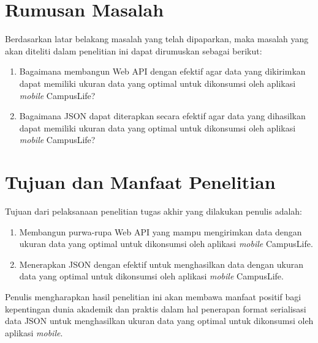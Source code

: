 \documentclass[a4paper, 12pt]{report}
\begin{document}
\section{Rumusan Masalah}
\onehalfspacing Berdasarkan latar belakang masalah yang telah dipaparkan, maka masalah yang akan diteliti dalam penelitian ini dapat dirumuskan sebagai berikut:
\begin{enumerate}
  \item Bagaimana membangun Web API dengan efektif agar data yang dikirimkan dapat memiliki ukuran data yang optimal untuk dikonsumsi oleh aplikasi \textit{mobile} CampusLife?
  \item Bagaimana JSON dapat diterapkan secara efektif agar data yang dihasilkan dapat memiliki ukuran data yang optimal untuk dikonsumsi oleh aplikasi \textit{mobile} CampusLife?
\end{enumerate}

\section{Tujuan dan Manfaat Penelitian}
\onehalfspacing Tujuan dari pelaksanaan penelitian tugas akhir yang dilakukan penulis adalah:
\begin{enumerate}
  \item Membangun purwa-rupa Web API yang mampu mengirimkan data dengan ukuran data yang optimal untuk dikonsumsi oleh aplikasi \textit{mobile} CampusLife.
  \item Menerapkan JSON dengan efektif untuk menghasilkan data dengan ukuran data yang optimal untuk dikonsumsi oleh aplikasi \textit{mobile} CampusLife.
\end{enumerate}

\onehalfspacing Penulis mengharapkan hasil penelitian ini akan membawa manfaat positif bagi kepentingan dunia akademik dan praktis dalam hal penerapan format serialisasi data JSON untuk menghasilkan ukuran data yang optimal untuk dikonsumsi oleh aplikasi \textit{mobile}.
\end{document}
